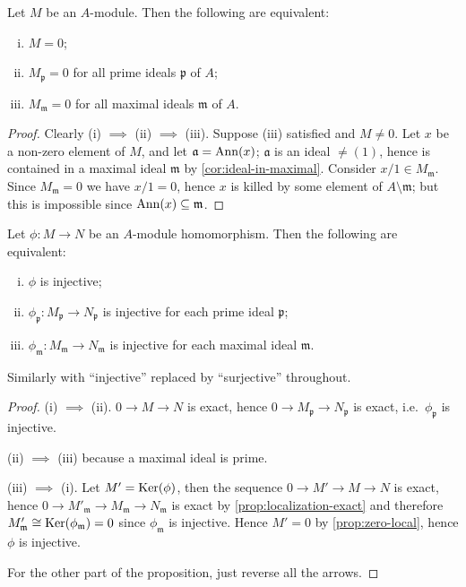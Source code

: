 \begin{proposition}\label{prop:zero-local}
Let $M$ be an $A$-module. Then the following are equivalent:
\begin{enumerate}[i)]
    \item $M = 0$;
    \item $M_{\mathfrak{p}} = 0$ for all prime ideals $\mathfrak{p}$ of $A$;
    \item $M_{\mathfrak{m}} = 0$ for all maximal ideals $\mathfrak{m}$ of $A$.
\end{enumerate}
\end{proposition}

\begin{proof}
Clearly (i) $\implies$ (ii) $\implies$ (iii). Suppose (iii) satisfied and $M \neq 0$. Let $x$ be a non-zero element of $M$, and let $\mathfrak{a} = \operatorname{Ann}(x)$; $\mathfrak{a}$ is an ideal $\neq (1)$, hence is contained in a maximal ideal $\mathfrak{m}$ by \eqref{cor:ideal-in-maximal}. Consider $x/1 \in M_{\mathfrak{m}}$. Since $M_{\mathfrak{m}} = 0$ we have $x/1 = 0$, hence $x$ is killed by some element of $A \setminus \mathfrak{m}$; but this is impossible since $\operatorname{Ann}(x) \subseteq \mathfrak{m}$.
\end{proof}

\begin{proposition}\label{prop:injective-surjective-local}
Let $\phi \colon M \to N$ be an $A$-module homomorphism. Then the following are equivalent:
\begin{enumerate}[i)]
    \item $\phi$ is injective;
    \item $\phi_{\mathfrak{p}} \colon M_{\mathfrak{p}} \to N_{\mathfrak{p}}$ is injective for each prime ideal $\mathfrak{p}$;
    \item $\phi_{\mathfrak{m}} \colon M_{\mathfrak{m}} \to N_{\mathfrak{m}}$ is injective for each maximal ideal $\mathfrak{m}$.
\end{enumerate}
Similarly with ``injective'' replaced by ``surjective'' throughout.
\end{proposition}

\begin{proof}
(i) $\implies$ (ii). $0 \to M \to N$ is exact, hence $0 \to M_{\mathfrak{p}} \to N_{\mathfrak{p}}$ is exact, i.e.\ $\phi_{\mathfrak{p}}$ is injective.

(ii) $\implies$ (iii) because a maximal ideal is prime.

(iii) $\implies$ (i). Let $M' = \operatorname{Ker}(\phi)$, then the sequence $0 \longrightarrow M' \longrightarrow M \longrightarrow N$ is exact, hence $0 \longrightarrow M'_{\mathfrak{m}} \longrightarrow M_{\mathfrak{m}} \longrightarrow N_{\mathfrak{m}}$ is exact by \eqref{prop:localization-exact} and therefore $M'_{\mathfrak{m}} \cong \operatorname{Ker}(\phi_{\mathfrak{m}}) = 0$ since $\phi_{\mathfrak{m}}$ is injective. Hence $M' = 0$ by \eqref{prop:zero-local}, hence $\phi$ is injective.

For the other part of the proposition, just reverse all the arrows.
\end{proof}

